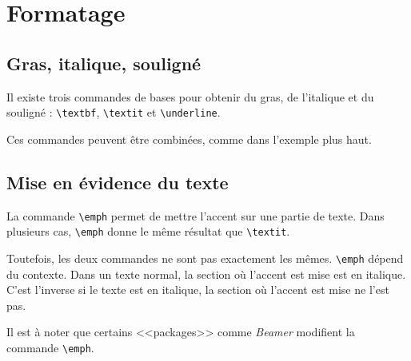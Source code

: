 \section{Formatage}

\subsection{Gras, italique, souligné}

Il existe trois commandes de bases pour obtenir du gras, de l'italique et du souligné :
\lstinline|\textbf|, \lstinline|\textit| et \lstinline|\underline|.



Ces commandes peuvent être combinées, comme dans l'exemple plus haut.

\subsection{Mise en évidence du texte}

La commande \lstinline|\emph| permet de mettre l'accent sur une partie de texte.
Dans plusieurs cas, \lstinline|\emph| donne le même résultat que \lstinline|\textit|.

Toutefois, les deux commandes ne sont pas exactement les mêmes. \lstinline|\emph| dépend du contexte.
Dans un texte normal, la section où l'accent est mise est en italique.
C'est l'inverse si le texte est en italique, la section où l'accent est mise ne l'est pas.



Il est à noter que certains <<packages>> comme \emph{Beamer} modifient la commande \lstinline|\emph|.
